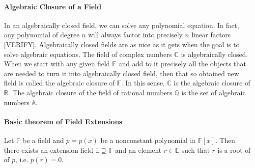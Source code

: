 





\paragraph{Algebraic Closure of a Field}
In an algebraically closed field, we can solve any polynomial equation. In fact, any polynomial of degree $n$ will always factor into precisely $n$ linear factors [VERIFY]. Algebraically closed fields are as nice as it gets when the goal is to solve algebraic equations. The field of complex numbers $\mathbb{C}$ is algebraically closed. When we start with any given field $\mathbb{F}$ and add to it precisely all the objects that are needed to turn it into algebraically closed field, then that so obtained new field is called the algebraic closure of $\mathbb{F}$. In this sense, $\mathbb{C}$ is the algebraic closure of $\mathbb{R}$. The algebraic closure of the field of rational numbers $\mathbb{Q}$ is the set of algebraic numbers $\mathbb{A}$. 





\paragraph{Basic theorem of Field Extensions}
Let $\mathbb{F}$ be a field and $p = p(x)$ be a nonconstant polynomial in $\mathbb{F}[x]$. Then there exists an extension field $\mathbb{E} \supseteq \mathbb{F}$ and an element $r \in \mathbb{E}$ such that $r$ is a root of of $p$, i.e. $p(r) = 0$.

